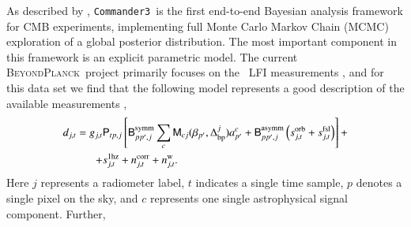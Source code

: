 \documentclass[twocolumn]{aa}
\def\commanderthree{\texttt{Commander3}}
\newcommand{\B}[0]{\tens{B}}
\newcommand{\M}[0]{\tens{M}}
\renewcommand{\P}[0]{\tens{P}}
\newcommand{\Dbp}[0]{\Delta_{\mathrm{bp}}}
\newcommand{\BP}{\textsc{BeyondPlanck}}
\begin{document}
As described by \citet{BP01}, \commanderthree\ is the first end-to-end
Bayesian analysis framework for CMB experiments, implementing full
Monte Carlo Markov Chain (MCMC) exploration of a global posterior
distribution. The most important component in this framework is an
explicit parametric model. The current \BP\ project primarily focuses
on the \Planck\ LFI measurements
\citep{planck2016-l01,planck2016-l02}, and for this data set we find
that the following model represents a good description of the
available measurements \citep{BP01},
\begin{equation}
  \begin{split}
    d_{j,t} = g_{j,t}&\P_{tp,j}\left[ \B^{\mathrm{symm}}_{pp',j}\sum_{c}
      \M_{cj}(\beta_{p'}, \Dbp^{j})a^c_{p'}  + \B^{\mathrm{asymm}}_{pp',j}\left(s^{\mathrm{orb}}_{j,t}  
      + s^{\mathrm{fsl}}_{j,t}\right)\right] + \\
    + &s^{\mathrm{1hz}}_{j,t} + n^{\mathrm{corr}}_{j,t} + n^{\mathrm{w}}_{j,t}.
  \end{split}
  \label{eq:todmodel}
\end{equation}
Here $j$ represents a radiometer label, $t$ indicates a single
time sample, $p$ denotes a single pixel on the sky, and $c$ represents
one single astrophysical signal component. Further,
\end{document}
